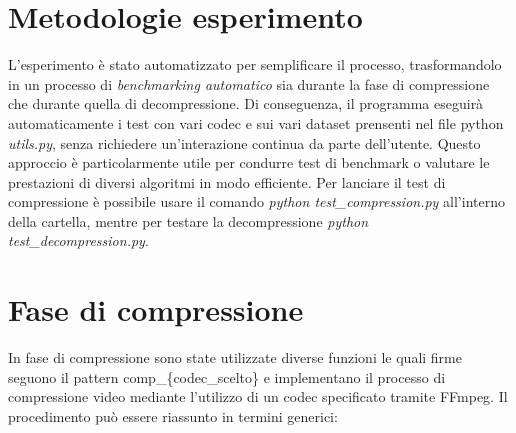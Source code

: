 \section{Metodologie esperimento}
L'esperimento è stato automatizzato per semplificare il processo, trasformandolo in un processo di \textit{benchmarking automatico} sia durante la fase di compressione che durante quella di decompressione. 
Di conseguenza, il programma eseguirà automaticamente i test con vari codec e sui vari dataset prensenti nel file python \textit{utils.py}, senza richiedere un'interazione continua da parte dell'utente. Questo approccio è particolarmente utile per condurre test di benchmark o valutare le prestazioni di diversi algoritmi in modo efficiente.
Per lanciare il test di compressione è possibile usare il comando \textit{python test\_compression.py} all'interno della cartella, mentre per testare la decompressione \textit{python test\_decompression.py}.

\section{Fase di compressione}

In fase di compressione sono state utilizzate diverse funzioni le quali firme seguono il pattern comp\_\{codec\_scelto\} e implementano il processo di compressione video mediante l'utilizzo di un codec specificato tramite FFmpeg. Il procedimento può essere riassunto in termini generici:

